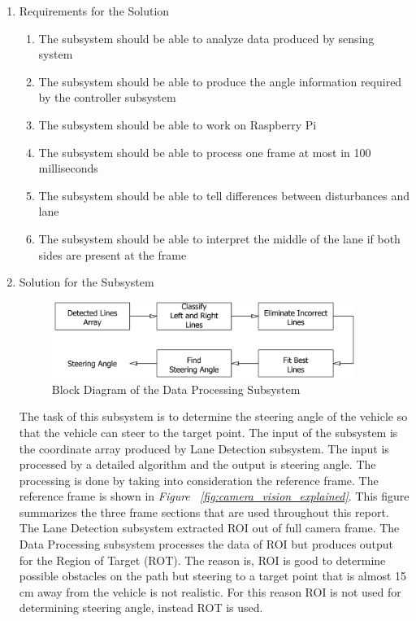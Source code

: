 \documentclass[a4paper,12pt]{article}
\begin{document}
		\begin{enumerate}
			\item {Requirements for the Solution}
			
				\begin{enumerate}
					\item The subsystem should be able to analyze data produced by sensing system
					\item The subsystem should be able to produce the angle information required by the controller subsystem
					\item The subsystem should be able to work on Raspberry Pi
					\item The subsystem should be able to process one frame at most in 100 milliseconds
					\item The subsystem should be able to tell differences between disturbances and lane
					\item The subsystem should be able to interpret the middle of the lane if both sides are present at the frame
				\end{enumerate}
				
			\item {Solution for the Subsystem}
			\begin{figure}[h]
				\includegraphics[width=0.93\textwidth,center]{images/vModels/dataProcessing_subsystem}
				\caption{Block Diagram of the Data Processing Subsystem}\label{fig:dataProcessing_subsystem}
			\end{figure}
			
		
			The task of this subsystem is to determine the steering angle of the vehicle so that the vehicle can steer to the target point. The input of the subsystem is the coordinate array produced by Lane Detection subsystem. The input is processed by a detailed algorithm and the output is steering angle. The processing is done by taking into consideration the reference frame. The reference frame is shown in \textit{Figure ~\ref{fig:camera_vision_explained}}. This figure summarizes the three frame sections that are used throughout this report. The Lane Detection subsystem extracted ROI out of full camera frame. The Data Processing subsystem processes the data of ROI but produces output for the Region of Target (ROT). The reason is, ROI is good to determine possible obstacles on the path but steering to a target point that is almost 15 cm away from the vehicle is not realistic.  For this reason ROI is not used for determining steering angle, instead ROT is used.
			

\end{enumerate}
\end{document}
